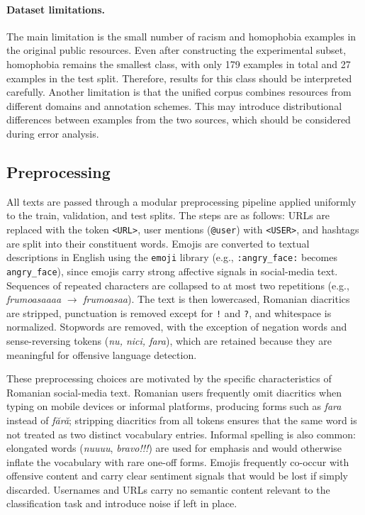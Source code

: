 \paragraph{Dataset limitations.}
The main limitation is the small number of racism and homophobia examples in the original public resources. Even after constructing the experimental subset, homophobia remains the smallest class, with only 179 examples in total and 27 examples in the test split. Therefore, results for this class should be interpreted carefully. Another limitation is that the unified corpus combines resources from different domains and annotation schemes. This may introduce distributional differences between examples from the two sources, which should be considered during error analysis.

\subsection{Preprocessing}
\label{subsec:preprocessing}

All texts are passed through a modular preprocessing pipeline applied uniformly to the train, validation, and test splits. The steps are as follows: URLs are replaced with the token \texttt{<URL>}, user mentions (\texttt{@user}) with \texttt{<USER>}, and hashtags are split into their constituent words. Emojis are converted to textual descriptions in English using the \texttt{emoji} library (e.g., \texttt{:angry\_face:} becomes \texttt{angry\_face}), since emojis carry strong affective signals in social-media text. Sequences of repeated characters are collapsed to at most two repetitions (e.g., \textit{frumoasaaaa} $\to$ \textit{frumoasaa}). The text is then lowercased, Romanian diacritics are stripped, punctuation is removed except for \texttt{!} and \texttt{?}, and whitespace is normalized. Stopwords are removed, with the exception of negation words and sense-reversing tokens (\textit{nu, nici, fara}), which are retained because they are meaningful for offensive language detection.

These preprocessing choices are motivated by the specific characteristics of Romanian social-media text. Romanian users frequently omit diacritics when typing on mobile devices or informal platforms, producing forms such as \textit{fara} instead of \textit{fără}; stripping diacritics from all tokens ensures that the same word is not treated as two distinct vocabulary entries. Informal spelling is also common: elongated words (\textit{nuuuu}, \textit{bravo!!!}) are used for emphasis and would otherwise inflate the vocabulary with rare one-off forms. Emojis frequently co-occur with offensive content and carry clear sentiment signals that would be lost if simply discarded. Usernames and URLs carry no semantic content relevant to the classification task and introduce noise if left in place.

